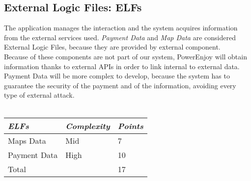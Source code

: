 \documentclass[11pt,a4paper]{report}
\begin{document}
\subsection{External Logic Files: ELFs}
The application manages the interaction and the system acquires information from the external services used.
\textit{Payment Data} and \textit{Map Data} are considered External Logic Files, because they are provided by external component.\\
Because of these components are not part of our system, PowerEnjoy will obtain information thanks to external APIs in order to link internal to external data.\\
Payment Data will be more complex to develop, because the system has to guarantee the security of the payment and of the information, avoiding every type of external attack.\\\\
\begin{tabularx}{\textwidth}{|X|X|X|}
	\hline
	\textit{ELFs} & \textit{Complexity} & \textit{Points}\\
	\hline
	Maps Data & Mid & 7\\
	Payment Data & High & 10\\
	\hline
	\hline
	Total & \multicolumn{1}{X}{}& \multicolumn{1}{X|}{17}\\
	\hline
\end{tabularx}
\end{document}
